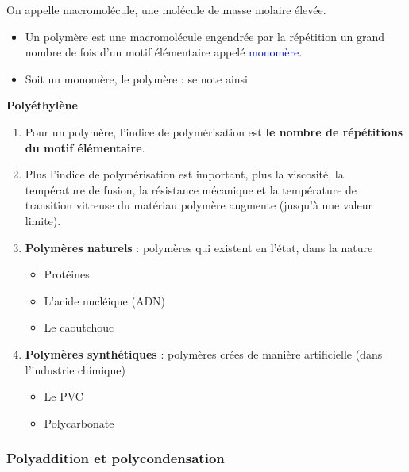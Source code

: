 \documentclass{article}
\begin{document}
On appelle macromolécule, une molécule de masse molaire élevée.
\begin{itemize}[noitemsep]
    \item Un polymère est une macromolécule engendrée par la répétition un grand nombre de fois d'un motif élémentaire appelé \textcolor{blue}{monomère}.
    \item Soit  un monomère, le polymère :  se note ainsi
\end{itemize}
\vspace{1em}

\begin{tcolorbox}[colback=blue!10!white, colframe=blue!75!black, title=Propriétés essentielles des polymères et exemples]
  \textbf{Polyéthylène}
\bigskip

\begin{enumerate}[noitemsep]
  \item Pour un polymère, l'indice de polymérisation est \textbf{le nombre de répétitions du motif élémentaire}.
  \item Plus l'indice de polymérisation est important, plus la viscosité, la température de fusion, la résistance mécanique et la température de transition vitreuse du matériau polymère augmente (jusqu'à une valeur limite).
  \item \textbf{Polymères naturels} : polymères qui existent en l'état, dans la nature
  \begin{itemize}[noitemsep]
    \item Protéines
    \item L'acide nucléique (ADN)
    \item Le caoutchouc
  \end{itemize}
   \item \textbf{Polymères synthétiques} : polymères crées de manière artificielle (dans l'industrie chimique)
   \begin{itemize}[noitemsep]
    \item Le PVC
    \item Polycarbonate
  \end{itemize}
\end{enumerate}

\end{tcolorbox}

\subsubsection{Polyaddition et polycondensation}
\end{document}
